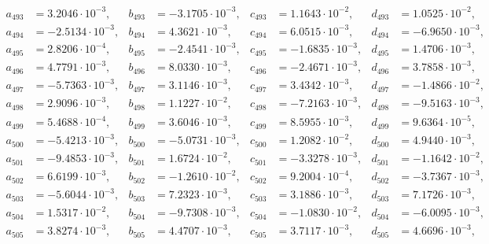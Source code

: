 \begin{align*}
  a_{ 493 } &= 3.2046 \cdot 10^{ -3 }, & b_{ 493 } &= -3.1705 \cdot 10^{ -3 }, & c_{ 493 } &= 1.1643 \cdot 10^{ -2 }, & d_{ 493 } &= 1.0525 \cdot 10^{ -2 }, \\ 
  a_{ 494 } &= -2.5134 \cdot 10^{ -3 }, & b_{ 494 } &= 4.3621 \cdot 10^{ -3 }, & c_{ 494 } &= 6.0515 \cdot 10^{ -3 }, & d_{ 494 } &= -6.9650 \cdot 10^{ -3 }, \\ 
  a_{ 495 } &= 2.8206 \cdot 10^{ -4 }, & b_{ 495 } &= -2.4541 \cdot 10^{ -3 }, & c_{ 495 } &= -1.6835 \cdot 10^{ -3 }, & d_{ 495 } &= 1.4706 \cdot 10^{ -3 }, \\ 
  a_{ 496 } &= 4.7791 \cdot 10^{ -3 }, & b_{ 496 } &= 8.0330 \cdot 10^{ -3 }, & c_{ 496 } &= -2.4671 \cdot 10^{ -3 }, & d_{ 496 } &= 3.7858 \cdot 10^{ -3 }, \\ 
  a_{ 497 } &= -5.7363 \cdot 10^{ -3 }, & b_{ 497 } &= 3.1146 \cdot 10^{ -3 }, & c_{ 497 } &= 3.4342 \cdot 10^{ -3 }, & d_{ 497 } &= -1.4866 \cdot 10^{ -2 }, \\ 
  a_{ 498 } &= 2.9096 \cdot 10^{ -3 }, & b_{ 498 } &= 1.1227 \cdot 10^{ -2 }, & c_{ 498 } &= -7.2163 \cdot 10^{ -3 }, & d_{ 498 } &= -9.5163 \cdot 10^{ -3 }, \\ 
  a_{ 499 } &= 5.4688 \cdot 10^{ -4 }, & b_{ 499 } &= 3.6046 \cdot 10^{ -3 }, & c_{ 499 } &= 8.5955 \cdot 10^{ -3 }, & d_{ 499 } &= 9.6364 \cdot 10^{ -5 }, \\ 
  a_{ 500 } &= -5.4213 \cdot 10^{ -3 }, & b_{ 500 } &= -5.0731 \cdot 10^{ -3 }, & c_{ 500 } &= 1.2082 \cdot 10^{ -2 }, & d_{ 500 } &= 4.9440 \cdot 10^{ -3 }, \\ 
  a_{ 501 } &= -9.4853 \cdot 10^{ -3 }, & b_{ 501 } &= 1.6724 \cdot 10^{ -2 }, & c_{ 501 } &= -3.3278 \cdot 10^{ -3 }, & d_{ 501 } &= -1.1642 \cdot 10^{ -2 }, \\ 
  a_{ 502 } &= 6.6199 \cdot 10^{ -3 }, & b_{ 502 } &= -1.2610 \cdot 10^{ -2 }, & c_{ 502 } &= 9.2004 \cdot 10^{ -4 }, & d_{ 502 } &= -3.7367 \cdot 10^{ -3 }, \\ 
  a_{ 503 } &= -5.6044 \cdot 10^{ -3 }, & b_{ 503 } &= 7.2323 \cdot 10^{ -3 }, & c_{ 503 } &= 3.1886 \cdot 10^{ -3 }, & d_{ 503 } &= 7.1726 \cdot 10^{ -3 }, \\ 
  a_{ 504 } &= 1.5317 \cdot 10^{ -2 }, & b_{ 504 } &= -9.7308 \cdot 10^{ -3 }, & c_{ 504 } &= -1.0830 \cdot 10^{ -2 }, & d_{ 504 } &= -6.0095 \cdot 10^{ -3 }, \\ 
  a_{ 505 } &= 3.8274 \cdot 10^{ -3 }, & b_{ 505 } &= 4.4707 \cdot 10^{ -3 }, & c_{ 505 } &= 3.7117 \cdot 10^{ -3 }, & d_{ 505 } &= 4.6696 \cdot 10^{ -3 }, \\ 

\end{align*}
